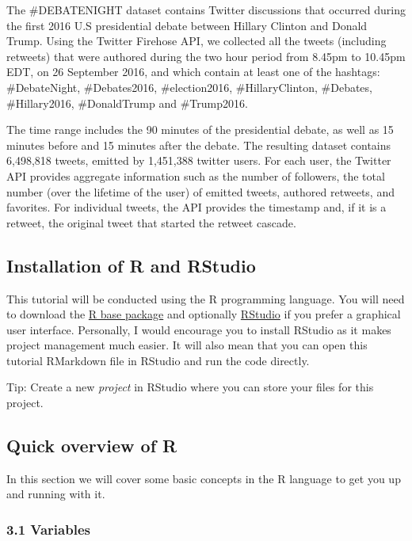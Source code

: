 \documentclass[]{article}
\begin{document}
The \#DEBATENIGHT dataset contains Twitter discussions that occurred
during the first 2016 U.S presidential debate between Hillary Clinton
and Donald Trump. Using the Twitter Firehose API, we collected all the
tweets (including retweets) that were authored during the two hour
period from 8.45pm to 10.45pm EDT, on 26 September 2016, and which
contain at least one of the hashtags: \#DebateNight, \#Debates2016,
\#election2016, \#HillaryClinton, \#Debates, \#Hillary2016,
\#DonaldTrump and \#Trump2016.

The time range includes the 90 minutes of the presidential debate, as
well as 15 minutes before and 15 minutes after the debate. The resulting
dataset contains 6,498,818 tweets, emitted by 1,451,388 twitter users.
For each user, the Twitter API provides aggregate information such as
the number of followers, the total number (over the lifetime of the
user) of emitted tweets, authored retweets, and favorites. For
individual tweets, the API provides the timestamp and, if it is a
retweet, the original tweet that started the retweet cascade.

\hypertarget{installation-of-r-and-rstudio}{%
\subsection{Installation of R and
RStudio}\label{installation-of-r-and-rstudio}}

This tutorial will be conducted using the R programming language. You
will need to download the \href{https://cran.r-project.org/}{R base
package} and optionally
\href{https://www.rstudio.com/products/rstudio/download/}{RStudio} if
you prefer a graphical user interface. Personally, I would encourage you
to install RStudio as it makes project management much easier. It will
also mean that you can open this tutorial RMarkdown file in RStudio and
run the code directly.

Tip: Create a new \emph{project} in RStudio where you can store your
files for this project.

\hypertarget{quick-overview-of-r}{%
\subsection{Quick overview of R}\label{quick-overview-of-r}}

In this section we will cover some basic concepts in the R language to
get you up and running with it.

\hypertarget{variables}{%
\subsubsection{3.1 Variables}\label{variables}}
\end{document}
